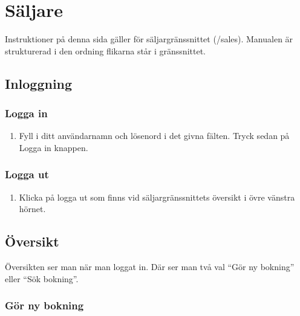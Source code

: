 \documentclass[a4paper, twoside, 11pt, titlepage]{article}
\begin{document}
\clearpage
\section{Säljare}


Instruktioner på denna sida gäller för säljargränssnittet (/sales). Manualen är strukturerad i den ordning flikarna står i gränssnittet.

	\subsection{Inloggning}



		\subsubsection{Logga in}


		\begin{enumerate}
		\item Fyll i ditt användarnamn och lösenord i det givna fälten. Tryck sedan på Logga in knappen.
		\end{enumerate}

		\subsubsection{Logga ut}


		\begin{enumerate}
		\item Klicka på logga ut som finns vid säljargränssnittets översikt i övre vänstra hörnet.
		\end{enumerate}

	\subsection{Översikt}


	Översikten ser man när man loggat in. Där ser man två val ``Gör ny bokning'' eller ``Sök bokning''.

		\subsubsection{Gör ny bokning}
\end{document}
